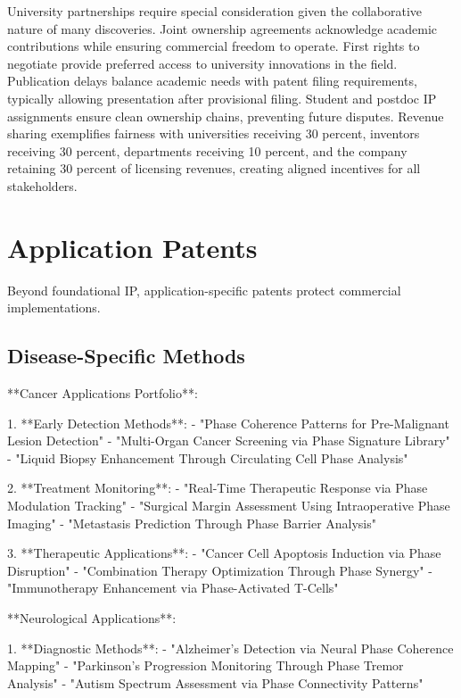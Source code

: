 \documentclass[12pt,a4paper]{report}
\begin{document}
University partnerships require special consideration given the collaborative nature of many discoveries. Joint ownership agreements acknowledge academic contributions while ensuring commercial freedom to operate. First rights to negotiate provide preferred access to university innovations in the field. Publication delays balance academic needs with patent filing requirements, typically allowing presentation after provisional filing. Student and postdoc IP assignments ensure clean ownership chains, preventing future disputes. Revenue sharing exemplifies fairness with universities receiving 30 percent, inventors receiving 30 percent, departments receiving 10 percent, and the company retaining 30 percent of licensing revenues, creating aligned incentives for all stakeholders.

\section{Application Patents}

Beyond foundational IP, application-specific patents protect commercial implementations.

\subsection{Disease-Specific Methods}

**Cancer Applications Portfolio**:

1. **Early Detection Methods**:
   - "Phase Coherence Patterns for Pre-Malignant Lesion Detection"
   - "Multi-Organ Cancer Screening via Phase Signature Library"
   - "Liquid Biopsy Enhancement Through Circulating Cell Phase Analysis"

2. **Treatment Monitoring**:
   - "Real-Time Therapeutic Response via Phase Modulation Tracking"
   - "Surgical Margin Assessment Using Intraoperative Phase Imaging"
   - "Metastasis Prediction Through Phase Barrier Analysis"

3. **Therapeutic Applications**:
   - "Cancer Cell Apoptosis Induction via Phase Disruption"
   - "Combination Therapy Optimization Through Phase Synergy"
   - "Immunotherapy Enhancement via Phase-Activated T-Cells"

**Neurological Applications**:

1. **Diagnostic Methods**:
   - "Alzheimer's Detection via Neural Phase Coherence Mapping"
   - "Parkinson's Progression Monitoring Through Phase Tremor Analysis"
   - "Autism Spectrum Assessment via Phase Connectivity Patterns"
\end{document}
